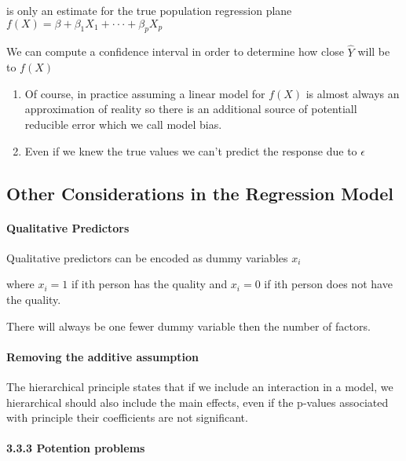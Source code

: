 \documentclass[
]{article}
\begin{document}
is only an estimate for the true population regression plane
\(f(X) = \beta+\beta_1 X_1 +\cdot\cdot\cdot+ \beta_p X_p\)

We can compute a confidence interval in order to determine how close
\(\hat Y\) will be to \(f(X)\)

\begin{enumerate}
\def\labelenumi{\arabic{enumi}.}
\setcounter{enumi}{1}
\item
  Of course, in practice assuming a linear model for \(f(X)\) is almost
  always an approximation of reality so there is an additional source of
  potentiall reducible error which we call model bias.
\item
  Even if we knew the true values we can't predict the response due to
  \(\epsilon\)
\end{enumerate}

\hypertarget{other-considerations-in-the-regression-model}{%
\subsection{Other Considerations in the Regression
Model}\label{other-considerations-in-the-regression-model}}

\hypertarget{qualitative-predictors}{%
\paragraph{Qualitative Predictors}\label{qualitative-predictors}}

Qualitative predictors can be encoded as dummy variables \(x_i\)

where \(x_i = 1\) if ith person has the quality and \(x_i = 0\) if ith
person does not have the quality.

There will always be one fewer dummy variable then the number of
factors.

\hypertarget{removing-the-additive-assumption}{%
\paragraph{Removing the additive
assumption}\label{removing-the-additive-assumption}}

The hierarchical principle states that if we include an interaction in a
model, we hierarchical should also include the main effects, even if the
p-values associated with principle their coefficients are not
significant.

\hypertarget{potention-problems}{%
\paragraph{3.3.3 Potention problems}\label{potention-problems}}
\end{document}
